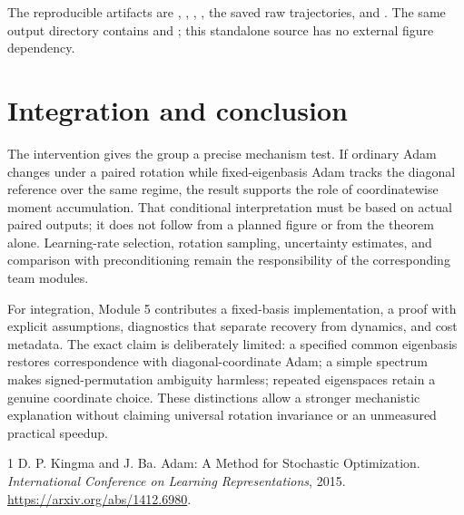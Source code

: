 \documentclass[11pt,a4paper]{article}
\begin{document}
The reproducible artifacts are ,
, , ,
the saved raw trajectories, and .
The same output directory contains  and
; this standalone source has no external figure dependency.

\section{Integration and conclusion}
The intervention gives the group a precise mechanism test. If ordinary Adam
changes under a paired rotation while fixed-eigenbasis Adam tracks the diagonal
reference over the same regime, the result supports the role of coordinatewise
moment accumulation. That conditional interpretation must be based on actual
paired outputs; it does not follow from a planned figure or from the theorem
alone. Learning-rate selection, rotation sampling, uncertainty estimates, and
comparison with preconditioning remain the responsibility of the corresponding
team modules.

For integration, Module 5 contributes a fixed-basis implementation, a proof
with explicit assumptions, diagnostics that separate recovery from dynamics,
and cost metadata. The exact claim is deliberately limited: a specified common
eigenbasis restores correspondence with diagonal-coordinate Adam; a simple
spectrum makes signed-permutation ambiguity harmless; repeated eigenspaces
retain a genuine coordinate choice. These distinctions allow a stronger
mechanistic explanation without claiming universal rotation invariance or an
unmeasured practical speedup.

\begin{thebibliography}{1}
D. P. Kingma and J. Ba.
\newblock Adam: A Method for Stochastic Optimization.
\newblock \emph{International Conference on Learning Representations}, 2015.
\newblock \url{https://arxiv.org/abs/1412.6980}.
\end{thebibliography}
\end{document}
